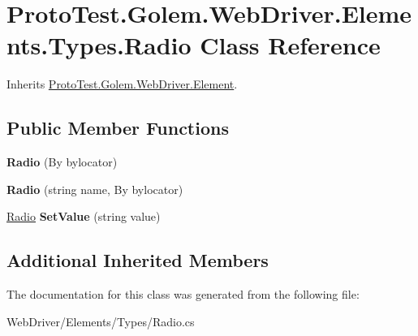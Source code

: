 \hypertarget{class_proto_test_1_1_golem_1_1_web_driver_1_1_elements_1_1_types_1_1_radio}{\section{Proto\-Test.\-Golem.\-Web\-Driver.\-Elements.\-Types.\-Radio Class Reference}
\label{class_proto_test_1_1_golem_1_1_web_driver_1_1_elements_1_1_types_1_1_radio}
}


Inherits \hyperlink{class_proto_test_1_1_golem_1_1_web_driver_1_1_element}{Proto\-Test.\-Golem.\-Web\-Driver.\-Element}.

\subsection*{Public Member Functions}
\begin{DoxyCompactItemize}
\item 
\hypertarget{class_proto_test_1_1_golem_1_1_web_driver_1_1_elements_1_1_types_1_1_radio_af983ac000daf758c6b0239443db3c4dc}{{\bfseries Radio} (By bylocator)}\label{class_proto_test_1_1_golem_1_1_web_driver_1_1_elements_1_1_types_1_1_radio_af983ac000daf758c6b0239443db3c4dc}

\item 
\hypertarget{class_proto_test_1_1_golem_1_1_web_driver_1_1_elements_1_1_types_1_1_radio_a19d9f83f2e773bdaaeac62da7b069451}{{\bfseries Radio} (string name, By bylocator)}\label{class_proto_test_1_1_golem_1_1_web_driver_1_1_elements_1_1_types_1_1_radio_a19d9f83f2e773bdaaeac62da7b069451}

\item 
\hypertarget{class_proto_test_1_1_golem_1_1_web_driver_1_1_elements_1_1_types_1_1_radio_a2c49b6fc0292e8ab99056a464855be0a}{\hyperlink{class_proto_test_1_1_golem_1_1_web_driver_1_1_elements_1_1_types_1_1_radio}{Radio} {\bfseries Set\-Value} (string value)}\label{class_proto_test_1_1_golem_1_1_web_driver_1_1_elements_1_1_types_1_1_radio_a2c49b6fc0292e8ab99056a464855be0a}

\end{DoxyCompactItemize}
\subsection*{Additional Inherited Members}


The documentation for this class was generated from the following file\-:\begin{DoxyCompactItemize}
\item 
Web\-Driver/\-Elements/\-Types/Radio.\-cs\end{DoxyCompactItemize}
